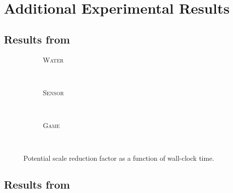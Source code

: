 \chapter{Additional Experimental Results}
\vspace{-2em}
\section{Results from }
\vspace{-2em}

\setlength{}
\setlength{}
\renewcommand{\subflen}{1.0\textwidth}
\begin{figure}[h!]
  \begin{subfigure}[b]{\subflen}
    \centering
    
    \vspace{-0.5em}
    \caption{\textsc{Water}}
    \label{fig:water1_time}
  \end{subfigure}\\
  \begin{subfigure}[b]{\subflen}
    \centering
    
    \vspace{-0.5em}
    \caption{\textsc{Sensor}}
    \label{fig:berkeley1_time}
  \end{subfigure}\\
  \begin{subfigure}[b]{\subflen}
    \centering
    
    \vspace{-0.5em}
    \caption{\textsc{Game}}
    \label{fig:hots1_time}
  \end{subfigure}\\[-1em]
  \caption{
    Potential scale reduction factor as a function of wall-clock time.
    }
  \label{fig:exptime}
\end{figure}


\section{Results from }

